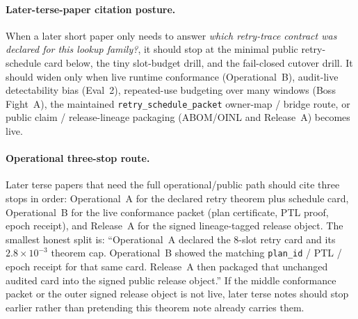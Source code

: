 \documentclass[11pt]{article}
\begin{document}
\paragraph{Later-terse-paper citation posture.}
When a later short paper only needs to answer \emph{which retry-trace contract was declared for this lookup family?}, it should stop at the minimal public retry-schedule card below, the tiny slot-budget drill, and the fail-closed cutover drill.
It should widen only when live runtime conformance (Operational~B), audit-live detectability bias (Eval~2), repeated-use budgeting over many windows (Boss Fight~A), the maintained \nolinkurl{retry\_schedule\_packet} owner-map / bridge route, or public claim / release-lineage packaging (ABOM/OINL and Release~A) becomes live.\cite{series:operationalB,series:advantagecontracts,series:bossfightA,series:workedexample,series:seriesspines,series:abomoinl,series:releaseproperty}

\paragraph{Operational three-stop route.}
Later terse papers that need the full operational/public path should cite three stops in order: Operational~A for the declared retry theorem plus schedule card, Operational~B for the live conformance packet (plan certificate, PTL proof, epoch receipt), and Release~A for the signed lineage-tagged release object.
The smallest honest split is: ``Operational~A declared the $8$-slot retry card and its $2.8\times 10^{-3}$ theorem cap. Operational~B showed the matching \texttt{plan\_id} / PTL / epoch receipt for that same card. Release~A then packaged that unchanged audited card into the signed public release object.''
If the middle conformance packet or the outer signed release object is not live, later terse notes should stop earlier rather than pretending this theorem note already carries them.\cite{series:operationalB,series:releaseproperty}
\end{document}
